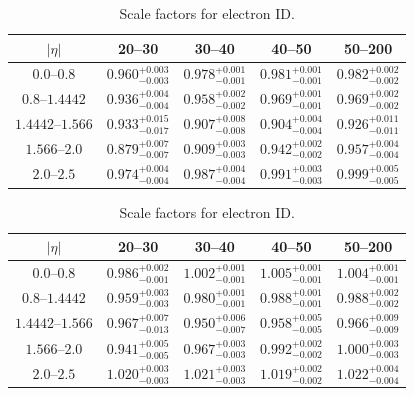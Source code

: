\begin{table}[h]
\centering
\begin{center}
    \begin{tabular}{ | c | c | c | c | c |} \hline
	$|\eta|$                   & 20--30 \GeV               & 30--40 \GeV               & 40--50 \GeV               & 50--200 \GeV \\ \hline
	$\numrange{0.0}{0.8}$      & $0.960_{-0.003}^{+0.003}$ & $0.978_{-0.001}^{+0.001}$ & $0.981_{-0.001}^{+0.001}$ & $0.982_{-0.002}^{+0.002}$ \\ \hline
	$\numrange{0.8}{1.4442}$   & $0.936_{-0.004}^{+0.004}$ & $0.958_{-0.002}^{+0.002}$ & $0.969_{-0.001}^{+0.001}$ & $0.969_{-0.002}^{+0.002}$ \\ \hline
	$\numrange{1.4442}{1.566}$ & $0.933_{-0.017}^{+0.015}$ & $0.907_{-0.008}^{+0.008}$ & $0.904_{-0.004}^{+0.004}$ & $0.926_{-0.011}^{+0.011}$ \\ \hline
	$\numrange{1.566}{2.0}$    & $0.879_{-0.007}^{+0.007}$ & $0.909_{-0.003}^{+0.003}$ & $0.942_{-0.002}^{+0.002}$ & $0.957_{-0.004}^{+0.004}$ \\ \hline
	$\numrange{2.0}{2.5}$      & $0.974_{-0.004}^{+0.004}$ & $0.987_{-0.004}^{+0.004}$ & $0.991_{-0.003}^{+0.003}$ & $0.999_{-0.005}^{+0.005}$ \\ \hline
    \end{tabular}
\end{center}
\caption{
    Scale factors for \EGTIGHT electron ID.
}
\label{table:tight_scale_factor}
\end{table}

\begin{table}[h]
\centering
\begin{center}
    \begin{tabular}{ | c | c | c | c | c |} \hline
	$|\eta|$                   & 20--30 \GeV               & 30--40 \GeV               & 40--50 \GeV               & 50--200 \GeV \\ \hline
	$\numrange{0.0}{0.8}$      & $0.986_{-0.001}^{+0.002}$ & $1.002_{-0.001}^{+0.001}$ & $1.005_{-0.001}^{+0.001}$ & $1.004_{-0.001}^{+0.001}$ \\ \hline
	$\numrange{0.8}{1.4442}$   & $0.959_{-0.003}^{+0.003}$ & $0.980_{-0.001}^{+0.001}$ & $0.988_{-0.001}^{+0.001}$ & $0.988_{-0.002}^{+0.002}$ \\ \hline
	$\numrange{1.4442}{1.566}$ & $0.967_{-0.013}^{+0.007}$ & $0.950_{-0.007}^{+0.006}$ & $0.958_{-0.005}^{+0.005}$ & $0.966_{-0.009}^{+0.009}$ \\ \hline
	$\numrange{1.566}{2.0}$    & $0.941_{-0.005}^{+0.005}$ & $0.967_{-0.003}^{+0.003}$ & $0.992_{-0.002}^{+0.002}$ & $1.000_{-0.003}^{+0.003}$ \\ \hline
	$\numrange{2.0}{2.5}$      & $1.020_{-0.003}^{+0.003}$ & $1.021_{-0.003}^{+0.003}$ & $1.019_{-0.002}^{+0.002}$ & $1.022_{-0.004}^{+0.004}$ \\ \hline
    \end{tabular}
\end{center}
\centering
\caption{
    Scale factors for \EGMEDIUM electron ID.
}
\label{table:medium_scale_factor}
\end{table}

